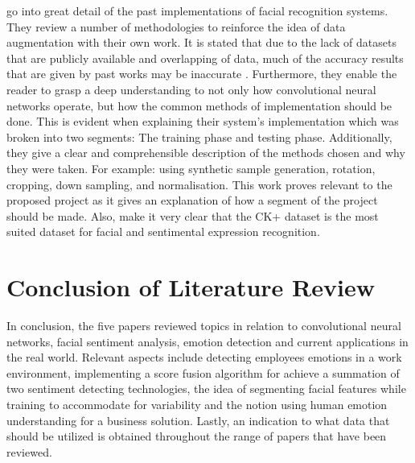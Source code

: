  \citeauthor{LOPES} go into great detail of the past implementations of facial recognition systems. They review a number of methodologies to reinforce the idea of data augmentation with their own work. It is stated that due to the lack of datasets that are publicly available and overlapping of data, much of the accuracy results that are given by past works may be inaccurate \citep{LOPES}. Furthermore, they enable the reader to grasp a deep understanding to not only how convolutional neural networks operate, but how the common methods of implementation should be done. This is evident when explaining their system's implementation which was broken into two segments: The training phase and testing phase. Additionally, they give a clear and comprehensible description of the methods chosen and why they were taken. For example: using synthetic sample generation, rotation, cropping, down sampling, and normalisation. This work proves relevant to the proposed project as it gives an explanation of how a segment of the project should be made. Also, \citeauthor{LOPES} make it very clear that the CK+ dataset is the most suited dataset for facial and sentimental expression recognition. 

 \section{Conclusion of Literature Review}
 In conclusion, the five papers reviewed topics in relation to convolutional neural networks, facial sentiment analysis, emotion detection and current applications in the real world. Relevant aspects include detecting employees emotions in a work environment, implementing a score fusion algorithm for achieve a summation of two sentiment detecting technologies, the idea of segmenting facial features while training to accommodate for variability and the notion using human emotion understanding for a business solution. Lastly, an indication to what data that should be utilized is obtained throughout the range of papers that have been reviewed.